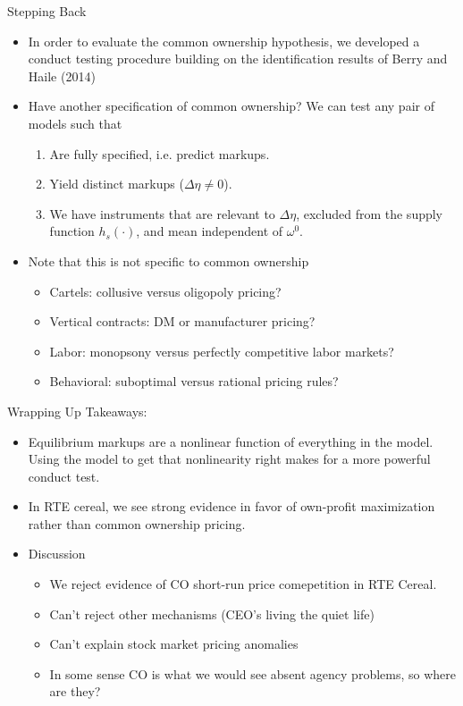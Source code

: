 \begin{frame}[plain]{Stepping Back}
\begin{itemize}
\item In order to evaluate the common ownership hypothesis, we developed a conduct testing procedure building on the identification results of Berry and Haile (2014)
\pause \item Have another specification of common ownership? We can test any pair of models such that
\begin{enumerate}
\item Are fully specified, i.e. predict markups.
\item Yield distinct markups ($\Delta\eta \neq 0$).
\item We have instruments that are relevant to $\Delta \eta$, excluded from the supply function $h_s(\cdot)$, and mean independent of $\omega^0$.
\end{enumerate}
\pause
\item Note that this is not specific to common ownership
\begin{itemize}
\item Cartels: collusive versus oligopoly pricing? 
\item Vertical contracts: DM  or manufacturer pricing?
\item Labor: monopsony versus perfectly competitive labor markets?
\item Behavioral: suboptimal versus rational pricing rules?
\end{itemize}
\end{itemize}
\end{frame}

\begin{frame}[plain]{Wrapping Up}
Takeaways:
\begin{itemize}
\item Equilibrium markups are a nonlinear function of everything in the model. Using the model to get that nonlinearity right makes for a more powerful conduct test.
\item In RTE cereal, we see strong evidence in favor of own-profit maximization rather than common ownership pricing.
\item Discussion
\begin{itemize}
    \item We reject evidence of CO short-run price comepetition in RTE Cereal.
    \item Can't reject other mechanisms (CEO's living the quiet life)
    \item Can't explain stock market pricing anomalies
    \item In some sense CO is what we would see absent agency problems, so where are they?
\end{itemize}
\end{itemize}
\end{frame}


